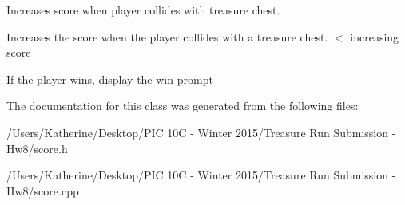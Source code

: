 Increases score when player collides with treasure chest. 

Increases the score when the player collides with a treasure chest. $<$ increasing score

If the player wins, display the win prompt 

The documentation for this class was generated from the following files\+:\begin{DoxyCompactItemize}
\item 
/\+Users/\+Katherine/\+Desktop/\+P\+I\+C 10\+C -\/ Winter 2015/\+Treasure Run Submission -\/ Hw8/score.\+h\item 
/\+Users/\+Katherine/\+Desktop/\+P\+I\+C 10\+C -\/ Winter 2015/\+Treasure Run Submission -\/ Hw8/score.\+cpp\end{DoxyCompactItemize}

